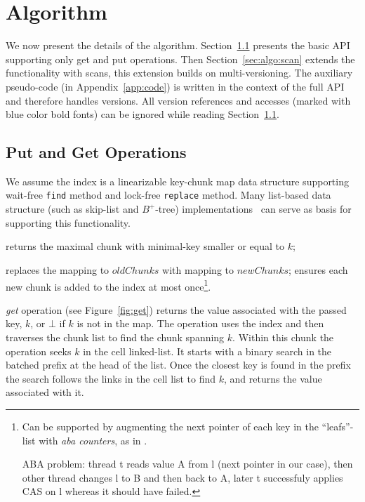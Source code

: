 \section{{\kiwi} Algorithm}
\label{sec:algo}
We now present the details of the {\kiwi} algorithm.
Section~\ref{sec:algo:putget} presents the basic API supporting only get and put operations. Then Section~\ref{sec:algo:scan} extends the functionality with scans, this extension builds on multi-versioning. The auxiliary pseudo-code (in Appendix~\ref{app:code}) is written in the context of the full API and therefore handles versions. All version references and accesses (marked with  blue color bold fonts) can be ignored while reading Section~\ref{sec:algo:putget}.


\subsection{Put and Get Operations}
\label{sec:algo:putget}

We assume the index is a linearizable key-chunk map data structure supporting wait-free \texttt{find} method and lock-free \texttt{replace} method.
Many list-based data structure (such as skip-list and $B^+$-tree) implementations~\cite{Fraser04, HerlihyLLS2007, BraginskyP2012,ArbelA2014,DrachslerVY2014} can serve as basis for supporting this functionality. 
\begin{description}
\setlength{\itemsep}{0pt}
\setlength{\parskip}{0pt}
\item[\texttt{find($k$)}:] returns the maximal chunk with minimal-key smaller or equal to $k$; 
\item[\texttt{replace($oldChunks$, $newChunks$)}:] replaces the mapping to $oldChunks$ with mapping to $newChunks$; ensures each new chunk is added to the index at most once\footnote{Can be supported by augmenting the next pointer of each key in the ``leafs''-list with \emph{aba counters}, as in \cite{BraginskyP2012}. 

\noindent 
ABA problem: thread t reads value
A from l (next pointer in our case), then other thread changes l to B and then back to A, later t successfuly
applies CAS on l whereas it should have failed.
}.
\end{description}



{\kiwi} \emph{get} operation (see Figure~\ref{fig:get}) returns the value associated with the passed key, $k$, or $\bot$ if $k$ is not in the map.
The operation uses the index and then traverses the chunk list to find the chunk spanning $k$.
Within this chunk the operation seeks $k$ in the cell linked-list. It starts with a binary search in the batched prefix at the head of the list. Once the closest key is found in the prefix the search follows the links in the cell list to find $k$, and returns the value associated with it. 

